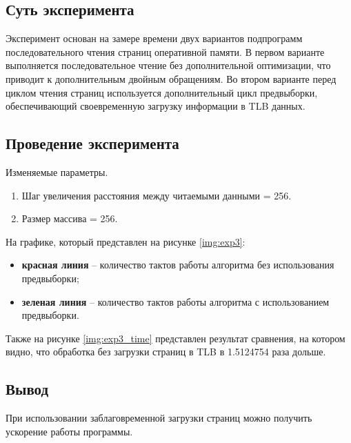 \subsection{Суть эксперимента}  
Эксперимент основан на замере времени двух вариантов подпрограмм последовательного чтения страниц оперативной памяти. В первом варианте выполняется последовательное чтение без дополнительной оптимизации, что приводит к дополнительным двойным обращениям. Во втором варианте перед циклом чтения страниц используется   дополнительный   цикл   предвыборки,   обеспечивающий   своевременную загрузку информации в TLB данных. 


\subsection{Проведение эксперимента}

Изменяемые параметры.

\begin{enumerate}
	\item Шаг увеличения расстояния между читаемыми данными = 256.
	\item Размер массива = 256.
\end{enumerate}

На графике, который представлен на рисунке \ref{img:exp3}:
\begin{itemize}
	\item \textbf{красная линия} -- количество тактов работы алгоритма без использования предвыборки;
	\item \textbf{зеленая линия} -- количество тактов работы алгоритма с использованием предвыборки.
\end{itemize}




\clearpage

Также на рисунке \ref{img:exp3_time} представлен результат сравнения, на котором видно, что обработка без загрузки страниц в TLB в 1.5124754 раза дольше.



\subsection{Вывод}

При использовании заблаговременной загрузки страниц можно получить ускорение работы программы.




